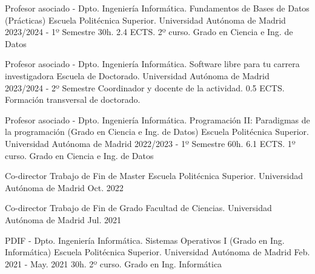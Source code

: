 \begin{cventries}
  \cventry
	{Profesor asociado - Dpto. Ingeniería Informática.} %
	{Fundamentos de Bases de Datos (Prácticas)} %
	{Escuela Politécnica Superior. Universidad Autónoma de Madrid} %
	{2023/2024 - 1º Semestre} %
	{30h. 2.4 ECTS. 2º curso. Grado en Ciencia e Ing. de Datos}

  \cventry
	{Profesor asociado - Dpto. Ingeniería Informática.} %
	{Software libre para tu carrera investigadora} %
	{Escuela de Doctorado. Universidad Autónoma de Madrid} %
	{2023/2024 - 2º Semestre} %
	{Coordinador y docente de la actividad. 0.5 ECTS. Formación transversal de doctorado.}

  \cventry
    {Profesor asociado - Dpto. Ingeniería Informática.} %
    {Programación II: Paradigmas de la programación (Grado en Ciencia e Ing. de Datos)} %
    {Escuela Politécnica Superior. Universidad Autónoma de Madrid} %
    {2022/2023 - 1º Semestre} %
    {60h. 6.1 ECTS. 1º curso. Grado en Ciencia e Ing. de Datos}
    

  \cventry
	{Co-director} %
	{Trabajo de Fin de Master} %
	{Escuela Politécnica Superior. Universidad Autónoma de Madrid} %
	{Oct. 2022} %
	{
		\begin{cvitems} %
			\item {}
		\end{cvitems}
	}

  \cventry
	{Co-director} %
	{Trabajo de Fin de Grado} %
	{Facultad de Ciencias. Universidad Autónoma de Madrid} %
	{Jul. 2021} %
	{
		\begin{cvitems} %
			\item {
			}
		\end{cvitems}
	}

  \cventry
    {PDIF - Dpto. Ingeniería Informática.} %
    {Sistemas Operativos I (Grado en Ing. Informática)} %
    {Escuela Politécnica Superior. Universidad Autónoma de Madrid} %
    {Feb. 2021 - May. 2021} %
    {30h. 2º curso. Grado en Ing. Informática}
    

\end{cventries}
